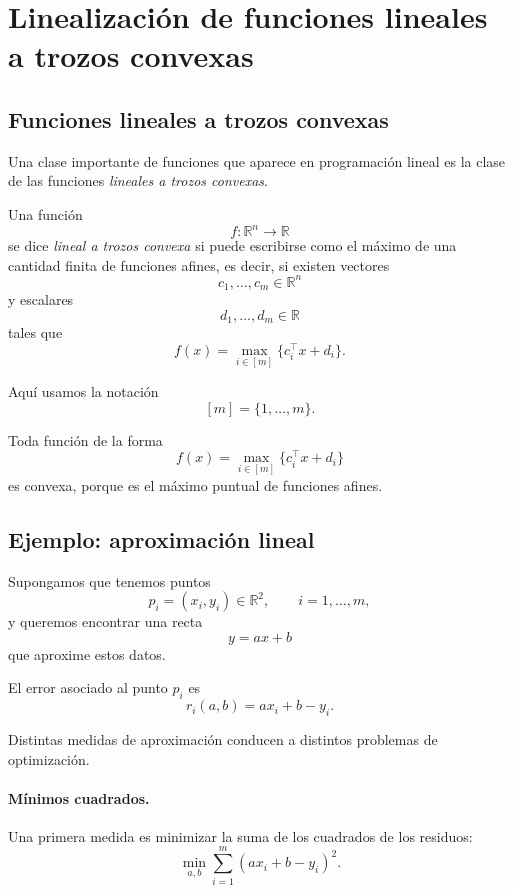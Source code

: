 
\section{Linealización de funciones lineales a trozos convexas}

\subsection{Funciones lineales a trozos convexas}

Una clase importante de funciones que aparece en programación lineal es la clase de las funciones \emph{lineales a trozos convexas}.

\begin{definition}
Una función
\[
    f:\mathbb{R}^n\to\mathbb{R}
\]
se dice \emph{lineal a trozos convexa} si puede escribirse como el máximo de una cantidad finita de funciones afines, es decir, si existen vectores
\[
    c_1,\dots,c_m\in\mathbb{R}^n
\]
y escalares
\[
    d_1,\dots,d_m\in\mathbb{R}
\]
tales que
\[
    f(x)
    =
    \max_{i\in[m]}
    \{c_i^\top x+d_i\}.
\]
\end{definition}

Aquí usamos la notación
\[
    [m]=\{1,\dots,m\}.
\]

\begin{remark}
Toda función de la forma
\[
    f(x)=\max_{i\in[m]}\{c_i^\top x+d_i\}
\]
es convexa, porque es el máximo puntual de funciones afines.
\end{remark}

\subsection{Ejemplo: aproximación lineal}

Supongamos que tenemos puntos
\[
    p_i=(x_i,y_i)\in\mathbb{R}^2,
    \qquad i=1,\dots,m,
\]
y queremos encontrar una recta
\[
    y=ax+b
\]
que aproxime estos datos.

El error asociado al punto \(p_i\) es
\[
    r_i(a,b)
    =
    ax_i+b-y_i.
\]

Distintas medidas de aproximación conducen a distintos problemas de optimización.

\paragraph{Mínimos cuadrados.}
Una primera medida es minimizar la suma de los cuadrados de los residuos:
\[
    \min_{a,b}
    \sum_{i=1}^{m}
    (ax_i+b-y_i)^2.
\]

